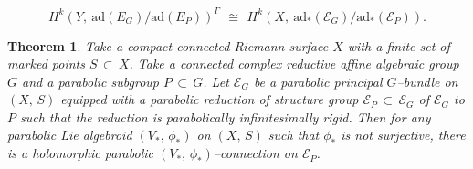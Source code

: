 \documentclass[10pt,a4paper]{amsart}
\newtheorem{theorem}{Theorem}
\newcommand{\ad}{\textrm{ad}}
\begin{document}
\begin{equation}\label{coh}
H^{k}(Y,\ \ad(E_{G})/\ad(E_{P}))^{\Gamma}\,\ \cong\,\ H^{k}(X,\
\ad_{*}(\mathcal{E}_{G})/\ad_{*}(\mathcal{E}_{P})).\end{equation}

\begin{theorem}\label{MAIN}
Take a compact connected Riemann surface $X$ with a finite set of marked points $S\, \subset\, X$.
Take a connected complex reductive affine algebraic group $G$ and a parabolic subgroup $P\, \subset\, G$.
Let $\mathcal{E}_{G}$ be a parabolic principal $G$--bundle on $(X,\,S)$ equipped with a
parabolic reduction of structure group $\mathcal{E}_{P}\, \subset\, \mathcal{E}_{G}$ of
$\mathcal{E}_{G}$ to $P$ such that the reduction is parabolically infinitesimally rigid.
Then for any parabolic Lie algebroid $(V_{*},\, \phi_{*})$ on $(X,\,S)$ such that
$\phi_{*}$ is not surjective, there is a holomorphic parabolic $(V_{*},\, \phi_{*})$--connection
on $\mathcal{E}_{P}$.
\end{theorem}
\end{document}

